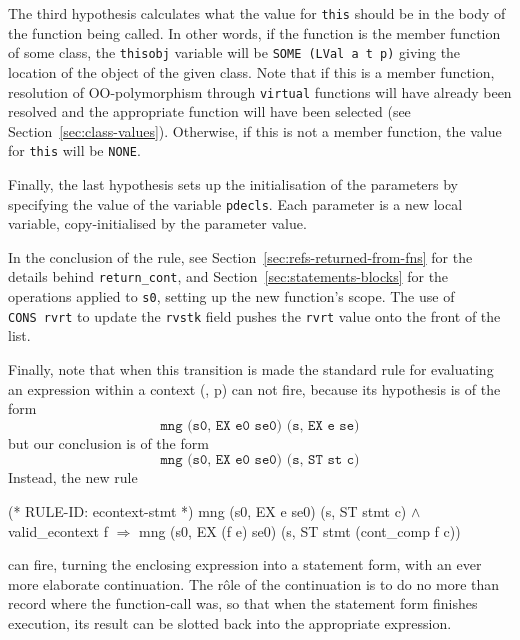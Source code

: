 \documentclass[11pt]{article}
\begin{document}
 The third hypothesis calculates what
the value for \texttt{this} should be in the
body of the function being called.  In other words, if the function is
the member function of some class, the \texttt{thisobj} variable will
be \texttt{SOME~(LVal~a~t~p)} giving the location of the object of the
given class.  Note that if this is a member function, resolution of
OO-polymorphism through \texttt{virtual} functions will have already
been resolved and the appropriate function will have been selected
(see Section~\ref{sec:class-values}).  Otherwise, if this is not a
member function, the value for \texttt{this} will be \texttt{NONE}.

Finally, the last hypothesis sets up the initialisation of the
parameters by specifying the value of the variable \texttt{pdecls}.
Each parameter is a new local variable, copy-initialised by the
parameter value.

In the conclusion of the rule, see
Section~\ref{sec:refs-returned-from-fns} for the details behind
\texttt{return_cont}, and Section~\ref{sec:statements-blocks} for the
operations applied to \texttt{s0}, setting up the new function's
scope. %
%
The use of \texttt{CONS~rvrt} to update the \texttt{rvstk} field
pushes the \texttt{rvrt} value onto the front of the list.

Finally, note that when this transition is made the standard rule for
evaluating an expression within a context (,
p\pageref{rule:econtext-expr}) can not fire, because its hypothesis is
of the form
\[
\texttt{mng (s0, EX e0 se0) (s, EX e se)}
\]
but our conclusion is of the form
\[
\texttt{mng (s0, EX e0 se0) (s, ST st c)}
\]
Instead, the new rule
\label{rule:econtext-stmt}
\begin{stdrule}
(* RULE-ID: econtext-stmt *)
     mng (s0, EX e se0) (s, ST stmt c) \(\land\)
     valid_econtext f
   \(\Rightarrow\)
     mng (s0, EX (f e) se0) (s, ST stmt (cont_comp f c))
\end{stdrule}
can fire, turning the enclosing expression into a statement form, with
an ever more elaborate continuation.   The r\^ole of the continuation
is to do no more than record where the function-call was, so that when
the statement form finishes execution, its result can be slotted back
into the appropriate expression.
%
\end{document}
